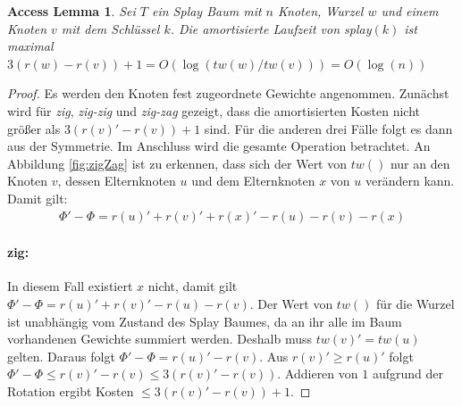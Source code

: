 \documentclass[a4paper,12pt]{article}
\begin{document}
\newtheorem{Lemma1}{Access Lemma}[section] \label{lemmaSplay}
\begin{Lemma1}Sei $T$ ein Splay Baum mit $n$ Knoten, Wurzel $w$ und einem Knoten $v$ mit dem Schlüssel $k$. Die amortisierte Laufzeit von \textit{splay}$\left(k\right)$ ist maximal $3 \left(r\left(w\right) - r\left(v\right)\right) + 1 = O\left(\log\left(\mathit{tw}\left(w\right) / \mathit{tw}\left(v\right)\right) \right) = O\left(\log\left(n\right)\right)$ \\
	
\end{Lemma1}
\begin{proof}
	Es werden den Knoten fest zugeordnete Gewichte angenommen. Zunächst wird für \textit{zig}, \textit{zig-zig} und \textit{zig-zag} gezeigt, dass die amortisierten Kosten nicht größer als $3 \left(r\left(v\right)' - r\left(v\right)\right) + 1$ sind. Für die anderen drei Fälle folgt es dann aus der Symmetrie. Im Anschluss wird die gesamte Operation  betrachtet. An Abbildung  \ref{fig:zigZag} ist zu erkennen, dass sich der Wert von $\mathit{tw}\left(\right)$ nur an den Knoten $v$, dessen Elternknoten $u$  und dem Elternknoten $x$ von $u$ verändern kann.  Damit gilt:
	\begin{align*}
	\Phi' - \Phi  = r\left(u\right)' +r\left(v\right)' +r\left(x\right)' - r\left(u\right)- r\left(v\right)- r\left(x\right)
	\end{align*}
	
	
	\paragraph{zig:} 
	In diesem Fall existiert $x$ nicht, damit gilt\\  {$ \Phi' - \Phi  = r\left(u\right)' +r\left(v\right)' - r\left(u\right)- r\left(v\right)$}. Der Wert von $\mathit{tw}\left(\right)$ für die Wurzel ist unabhängig vom Zustand des Splay Baumes, da an ihr alle im Baum vorhandenen Gewichte summiert werden. Deshalb muss  $\mathit{tw}\left(v\right)' =  \mathit{tw}\left(u\right)$ gelten. Daraus folgt $ \Phi' - \Phi  = r\left(u\right)'- r\left(v\right)$. Aus $r\left(v\right)' \geq r\left(u\right)'$ folgt \\ $ \Phi' - \Phi \leq  r\left(v\right)'- r\left(v\right) \leq 3\left(r\left(v\right)'- r\left(v\right)\right) $. Addieren von $1$ aufgrund der Rotation ergibt Kosten $\leq 3\left(r\left(v\right)'- r\left(v\right)\right) + 1$.

\end{proof}
\end{document}
